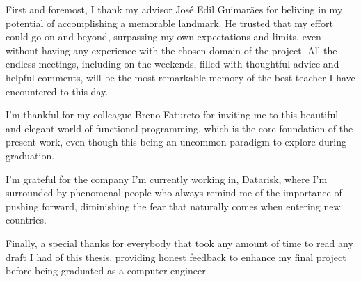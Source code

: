 First and foremost, I thank my advisor José Edil Guimarães for beliving in my potential of accomplishing a memorable landmark. He trusted that my effort could go on and beyond, surpassing my own expectations and limits, even without having any experience with the chosen domain of the project. All the endless meetings, including on the weekends, filled with thoughtful advice and helpful comments, will be the most remarkable memory of the best teacher I have encountered to this day.

I'm thankful for my colleague Breno Fatureto for inviting me to this beautiful and elegant world of functional programming, which is the core foundation of the present work, even though this being an uncommon paradigm to explore during graduation.

I'm grateful for the company I'm currently working in, Datarisk, where I'm surrounded by phenomenal people who always remind me of the importance of pushing forward, diminishing the fear that naturally comes when entering new countries.

Finally, a special thanks for everybody that took any amount of time to read any draft I had of this thesis, providing honest feedback to enhance my final project before being graduated as a computer engineer. 

